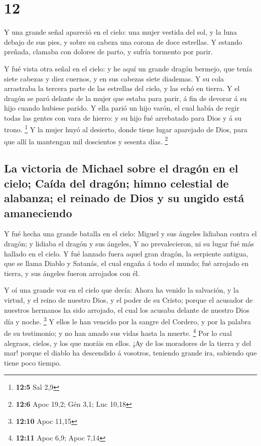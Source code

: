 \hypertarget{section-11}{%
\section{12}\label{section-11}}

 Y una grande señal apareció en el cielo: una mujer vestida
del sol, y la luna debajo de sus pies, y sobre su cabeza una corona de
doce estrellas.  Y estando preñada, clamaba con dolores de
parto, y sufría tormento por parir.

 Y fué vista otra señal en el cielo: y he aquí un grande
dragón bermejo, que tenía siete cabezas y diez cuernos, y en sus cabezas
siete diademas.  Y su cola arrastraba la tercera parte de
las estrellas del cielo, y las echó en tierra. Y el dragón se paró
delante de la mujer que estaba para parir, á fin de devorar á su hijo
cuando hubiese parido.  Y ella parió un hijo varón, el cual
había de regir todas las gentes con vara de hierro: y su hijo fué
arrebatado para Dios y á su trono. \footnote{\textbf{12:5} Sal 2,9}
 Y la mujer huyó al desierto, donde tiene lugar aparejado de
Dios, para que allí la mantengan mil doscientos y sesenta días.
\footnote{\textbf{12:6} Apoc 19,2; Gén 3,1; Luc 10,18}

\hypertarget{la-victoria-de-michael-sobre-el-draguxf3n-en-el-cielo-cauxedda-del-draguxf3n-himno-celestial-de-alabanza-el-reinado-de-dios-y-su-ungido-estuxe1-amaneciendo}{%
\subsection{La victoria de Michael sobre el dragón en el cielo; Caída
del dragón; himno celestial de alabanza; el reinado de Dios y su ungido
está
amaneciendo}\label{la-victoria-de-michael-sobre-el-draguxf3n-en-el-cielo-cauxedda-del-draguxf3n-himno-celestial-de-alabanza-el-reinado-de-dios-y-su-ungido-estuxe1-amaneciendo}}

 Y fué hecha una grande batalla en el cielo: Miguel y sus
ángeles lidiaban contra el dragón; y lidiaba el dragón y sus ángeles,
 Y no prevalecieron, ni su lugar fué más hallado en el
cielo.  Y fué lanzado fuera aquel gran dragón, la serpiente
antigua, que se llama Diablo y Satanás, el cual engaña á todo el mundo;
fué arrojado en tierra, y sus ángeles fueron arrojados con él.

 Y oí una grande voz en el cielo que decía: Ahora ha venido
la salvación, y la virtud, y el reino de nuestro Dios, y el poder de su
Cristo; porque el acusador de nuestros hermanos ha sido arrojado, el
cual los acusaba delante de nuestro Dios día y noche. \footnote{\textbf{12:10}
  Apoc 11,15}  Y ellos le han vencido por la sangre del
Cordero, y por la palabra de su testimonio; y no han amado sus vidas
hasta la muerte. \footnote{\textbf{12:11} Apoc 6,9; Apoc 7,14}
 Por lo cual alegraos, cielos, y los que moráis en ellos.
¡Ay de los moradores de la tierra y del mar! porque el diablo ha
descendido á vosotros, teniendo grande ira, sabiendo que tiene poco
tiempo.

